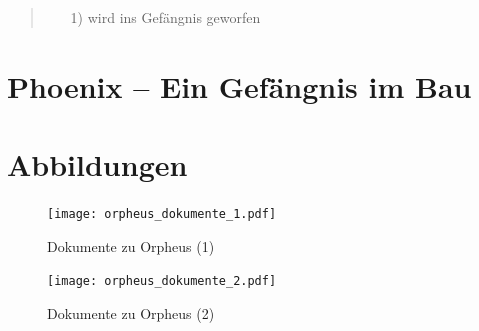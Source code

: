 \documentclass[a5paper,pagesize,numbers=noenddot]{scrbook}
\begin{document}
\begin{quote}
   \begin{itemize}
      \item[1)] wird ins Gefängnis geworfen
   \end{itemize}
\end{quote}


\chapter{Phoenix -- Ein Gefängnis im Bau}\label{ch:phoenix}


\clearpage
{}
\printbibliography


\clearpage
{}
\appendix
\renewcommand{\thefigure}{\arabic{figure}}

\chapter{Abbildungen}\label{ch:anhang_abbildungen}
\begin{figure}
   \centering
   \texttt{[image: orpheus\_dokumente\_1.pdf]}
   \caption{Dokumente zu Orpheus (1)}
   \label{fig:orpheus_dokumente_1}
\end{figure}

\begin{figure}
   \centering
   \texttt{[image: orpheus\_dokumente\_2.pdf]}
   \caption{Dokumente zu Orpheus (2)}
   \label{fig:orpheus_dokumente_2}
\end{figure}
\end{document}
